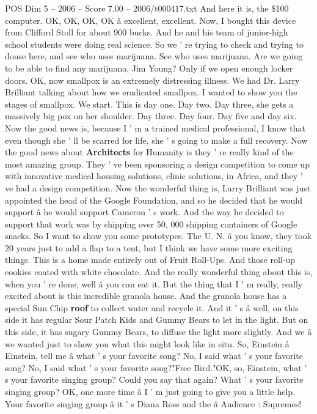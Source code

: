 \begin{textsample}{POS Dim 5 – 2006 – Score 7.00 – 2006/t000417.txt}
And here it is, the \$100 computer.
OK, OK, OK, OK â excellent, excellent.
Now, I bought this device from Clifford Stoll for about 900 bucks.
And he and his team of junior-high school students were doing real science.
So we ' re trying to check and trying to douse here, and see who uses marijuana.
See who uses marijuana.
Are we going to be able to find any marijuana, Jim Young?
Only if we open enough locker doors.
OK, now smallpox is an extremely distressing illness.
We had Dr.
Larry Brilliant talking about how we eradicated smallpox.
I wanted to show you the stages of smallpox.
We start.
This is day one.
Day two.
Day three, she gets a massively big pox on her shoulder.
Day three.
Day four.
Day five and day six.
Now the good news is, because I ' m a trained medical professional, I know that even though she ' ll be scarred for life, she ' s going to make a full recovery.
Now the good news about \textbf{Architects} for Humanity is they ' re really kind of the most amazing group.
They ' ve been sponsoring a design competition to come up with innovative medical housing solutions, clinic solutions, in Africa, and they ' ve had a design competition.
Now the wonderful thing is, Larry Brilliant was just appointed the head of the Google Foundation, and so he decided that he would support â he would support Cameron ' s work.
And the way he decided to support that work was by shipping over 50, 000 shipping containers of Google snacks.
So I want to show you some prototypes.
The U.
N. â you know, they took 20 years just to add a flap to a tent, but I think we have some more exciting things.
This is a home made entirely out of Fruit Roll-Ups.
And those roll-up cookies coated with white chocolate.
And the really wonderful thing about this is, when you ' re done, well â you can eat it.
But the thing that I ' m really, really excited about is this incredible granola house.
And the granola house has a special Sun Chip \textbf{roof} to collect water and recycle it.
And it ' s â well, on this side it has regular Sour Patch Kids and Gummy Bears to let in the light.
But on this side, it has sugary Gummy Bears, to diffuse the light more slightly.
And we â we wanted just to show you what this might look like in situ.
So, Einstein â Einstein, tell me â what ' s your favorite song?
No, I said what ' s your favorite song?
No, I said what ' s your favorite song?"Free Bird."OK, so, Einstein, what ' s your favorite singing group?
Could you say that again?
What ' s your favorite singing group?
OK, one more time â I ' m just going to give you a little help.
Your favorite singing group â it ' s Diana Ross and the â Audience : Supremes!

\end{textsample}
